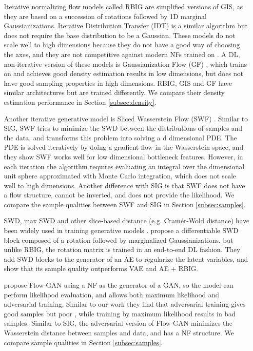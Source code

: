 \documentclass{article}
\begin{document}
Iterative normalizing flow models called 
RBIG \citep{chen2001gaussianization, laparra2011iterative} are simplified versions of GIS, as they are based on a succession of rotations followed by 1D marginal Gaussianizations. Iterative Distribution Transfer (IDT) \citep{pitie2007automated} is a similar algorithm but does not require the base distribution to be a Gaussian. These models do not scale well to high dimensions because they do not have a good way of choosing the 
axes, and they are not competitive against modern NFs trained on  \cite{meng2020gaussianization}. 
A DL, non-iterative version of these models is Gaussianization Flow (GF) \cite{meng2020gaussianization}, which trains on  and achieves good density estimation results in low dimensions, but does not have good sampling properties in high dimensions. RBIG, GIS and GF have similar architectures but are trained differently. We compare their density estimation performance in Section \ref{subsec:density}.

Another iterative generative model is Sliced Wasserstein Flow (SWF) \citep{liutkus2018sliced}. Similar to SIG, SWF tries to minimize the SWD between the distributions of samples and the data, and transforms this problem into solving a d dimensional PDE. The PDE is solved iteratively by doing a gradient flow in the Wasserstein space, and they show SWF works well for low dimensional bottleneck features. However, in each iteration the algorithm requires evaluating an integral over the  dimensional unit sphere approximated with Monte Carlo integration, which does not scale well to high dimensions. Another difference with SIG is that SWF does not have a flow structure, cannot be inverted, and does
not provide the likelihood. We compare the sample qualities between SWF and SIG in Section \ref{subsec:samples}.

SWD, max SWD and other slice-based distance (e.g. Cram{\'e}r-Wold distance) have been widely used in training generative models \citep{deshpande2018generative, deshpande2019max, wu2019sliced, kolouri2018sliced, knop2018cramer}. \citet{wu2019sliced} propose a differentiable SWD block composed of a rotation followed by marginalized Gaussianizations, but unlike RBIG, the rotation matrix is trained in an end-to-end DL fashion. They add SWD blocks to the generator of an AE to regularize the latent variables, and show that its sample quality outperforms VAE and AE + RBIG. 

\citet{grover2018flow} propose Flow-GAN using a NF as the generator of a GAN, so the model can perform likelihood evaluation, and allows both maximum likelihood and adversarial training. Similar to our work they find that adversarial training gives good samples but poor , while training by maximum likelihood results in bad samples. Similar to SIG, the adversarial version of Flow-GAN minimizes the Wasserstein distance between samples and data, and has a NF structure. We compare sample qualities in Section \ref{subsec:samples}.
\end{document}
